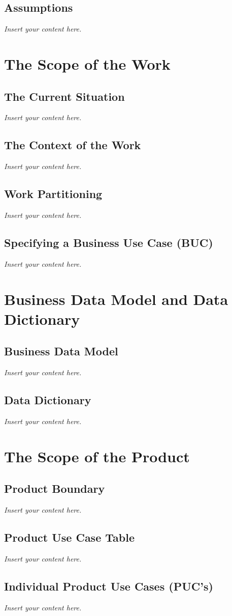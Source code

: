 \documentclass[12pt]{article}
\newcommand{\lips}{\textit{Insert your content here.}}
\begin{document}
\subsection{Assumptions}
\lips

\section{The Scope of the Work}
\subsection{The Current Situation}
\lips
\subsection{The Context of the Work}
\lips
\subsection{Work Partitioning}
\lips
\subsection{Specifying a Business Use Case (BUC)}
\lips

\section{Business Data Model and Data Dictionary}
\subsection{Business Data Model}
\lips
\subsection{Data Dictionary}
\lips

\section{The Scope of the Product}
\subsection{Product Boundary}
\lips
\subsection{Product Use Case Table}
\lips
\subsection{Individual Product Use Cases (PUC's)}
\lips
\end{document}

